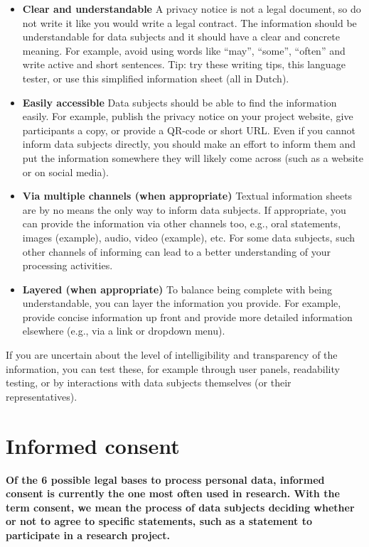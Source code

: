 \documentclass[
]{book}
\begin{document}
\begin{itemize}
\item
  \textbf{Clear and understandable}
  A privacy notice is not a legal document, so do not write it like you would
  write a legal contract. The information should be understandable for data
  subjects and it should have a clear and concrete meaning. For example, avoid
  using words like ``may'', ``some'', ``often'' and write active and short sentences.
  Tip: try these
  writing tips,
  this language tester,
  or use this
  simplified information sheet (all in Dutch).
\item
  \textbf{Easily accessible}
  Data subjects should be able to find the information easily. For example, publish
  the privacy notice on your project website, give participants a copy, or provide
  a QR-code or short URL. Even if you cannot inform data subjects directly, you
  should make an effort to inform them and put the information somewhere they will
  likely come across (such as a website or on social media).
\item
  \textbf{Via multiple channels (when appropriate)}
  Textual information sheets are by no means the only way to inform data subjects.
  If appropriate, you can provide the information via other channels too, e.g.,
  oral statements, images
  (example),
  audio, video
  (example),
  etc. For some data subjects, such other channels of informing can lead to a better
  understanding of your processing activities.
\item
  \textbf{Layered (when appropriate)}
  To balance being complete with being understandable, you can layer the
  information you provide. For example, provide concise information up front and
  provide more detailed information elsewhere (e.g., via a link or dropdown menu).
\end{itemize}

If you are uncertain about the level of intelligibility and transparency of the
information, you can test these, for example through user panels, readability
testing, or by interactions with data subjects themselves (or their
representatives).

\hypertarget{informed-consent-forms}{%
\section{Informed consent}\label{informed-consent-forms}}

\textbf{Of the 6 possible legal bases to process personal data, informed consent is
currently the one most often used in research. With the term consent, we mean
the process of data subjects deciding whether or not to agree to specific
statements, such as a statement to participate in a research project.}
\end{document}
